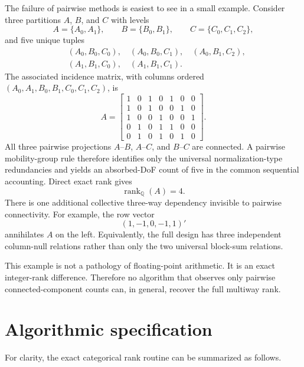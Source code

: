 \documentclass[11pt]{article}
\theoremstyle{definition}
\newcommand{\Q}{\mathbb{Q}}
\newcommand{\rank}{\operatorname{rank}}
\newcommand{\1}{\mathbf{1}}
\begin{document}
The failure of pairwise methods is easiest to see in a small example. Consider three partitions $A$, $B$, and $C$ with levels
\begin{equation*}
  A=\{A_0,A_1\},\qquad B=\{B_0,B_1\},\qquad C=\{C_0,C_1,C_2\},
\end{equation*}
and five unique tuples
\begin{align*}
 &(A_0,B_0,C_0),\quad (A_0,B_0,C_1),\quad (A_0,B_1,C_2),\\
 &(A_1,B_1,C_0),\quad (A_1,B_1,C_1).
\end{align*}
The associated incidence matrix, with columns ordered $(A_0,A_1,B_0,B_1,C_0,C_1,C_2)$, is
\begin{equation}
A=\begin{bmatrix}
1&0&1&0&1&0&0\\
1&0&1&0&0&1&0\\
1&0&0&1&0&0&1\\
0&1&0&1&1&0&0\\
0&1&0&1&0&1&0
\end{bmatrix}.
\label{eq:countermatrix}
\end{equation}
All three pairwise projections $A$--$B$, $A$--$C$, and $B$--$C$ are connected. A pairwise mobility-group rule therefore identifies only the universal normalization-type redundancies and yields an absorbed-DoF count of five in the common sequential accounting. Direct exact rank gives
\begin{equation}
  \rank_{\Q}(A)=4.
\end{equation}
There is one additional collective three-way dependency invisible to pairwise connectivity. For example, the row vector
\begin{equation}
  (1,-1,0,-1,1)'
\end{equation}
annihilates $A$ on the left. Equivalently, the full design has three independent column-null relations rather than only the two universal block-sum relations.

This example is not a pathology of floating-point arithmetic. It is an exact integer-rank difference. Therefore no algorithm that observes only pairwise connected-component counts can, in general, recover the full multiway rank.

\section{Algorithmic specification}

For clarity, the exact categorical rank routine can be summarized as follows.
\end{document}

